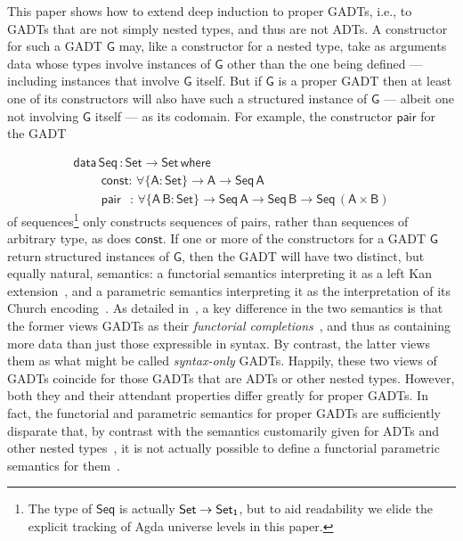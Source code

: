 \documentclass[9pt]{entcs}
\begin{document}
This paper shows how to extend deep induction to proper GADTs, i.e.,
to GADTs that are not simply nested types, and thus are not ADTs.  A
constructor for such a GADT $\mathsf{G}$ may, like a constructor for a
nested type, take as arguments data whose types involve instances of
$\mathsf{G}$ other than the one being defined --- including instances
that involve $\mathsf{G}$ itself. But if $\mathsf{G}$ is a proper GADT
then at least one of its constructors will also have such a structured
instance of $\mathsf{G}$ --- albeit one not involving $\mathsf{G}$
itself --- as its codomain.
For example, the constructor $\mathsf{pair}$ for the GADT 

\vspace*{-0.1in}

\begin{equation}\label{eq:seq}
\begin{array}{l}
\mathsf{data\, Seq\,: Set \to Set\,where}\\
\mathsf{\;\;\;\;\;\;\;\;const :\, \forall \{A : Set\} \to A \to Seq\,A}\\
\mathsf{\;\;\;\;\;\;\;\;pair\;\;\, :\,\forall \{A\,B : Set\} \to Seq \,A \to Seq\,B \to
  Seq\,(A \times B)}
\end{array}
\end{equation}
\noindent
of sequences\footnote{The type of $\mathsf{Seq}$ is actually
  $\mathsf{Set \to \mathsf{Set}_1}$, but to aid readability we elide the
  explicit tracking of Agda universe levels in this paper.} only
constructs sequences of pairs, rather than sequences of arbitrary
type, as does $\mathsf{const}$. If one or more of the constructors for
a GADT $\mathsf{G}$ return structured instances of $\mathsf{G}$, then
the GADT will have two distinct, but equally natural, semantics: a
functorial semantics interpreting it as a left Kan
extension~\cite{mac71}, and a parametric semantics interpreting it as
the interpretation of its Church encoding~\cite{atk12,vw10}. As
detailed in~\cite{jgj21}, a key difference in the two semantics is
that the former views GADTs as their {\em functorial
  completions}~\cite{jp19}, and thus as containing more data than just
those expressible in syntax. By contrast, the latter views them as
what might be called {\em syntax-only} GADTs. Happily, these two views
of GADTs coincide for those GADTs that are ADTs or other nested
types. However, both they and their attendant properties differ
greatly for proper GADTs. In fact, the functorial and parametric
semantics for proper GADTs are sufficiently disparate that, by
contrast with the semantics customarily given for ADTs and other
nested types~\cite{bfss90,gjfor15,jgj21f}, it is not actually possible
to define a functorial parametric semantics for them~\cite{jgj21}.
\end{document}
